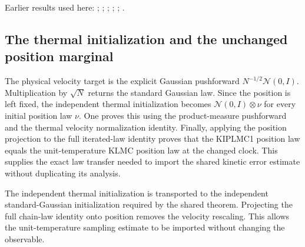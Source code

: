 \documentclass[11pt,a4paper]{report}
\begin{document}
Earlier results used here: \cite[Section~3.33.11]{LangevinLean2026ULASC}; \cite[Section~3.33.6]{LangevinLean2026ULASC}; \cite[Section~3.1.1]{LangevinLean2026IPLA}; \cite[Section~3.1.4]{LangevinLean2026IPLA}; \cite[Section~3.113.3]{LangevinLean2026Kinetic}; \cite[Section~3.12.2]{LangevinLean2026Kinetic}.
\subsection{\texorpdfstring{The thermal initialization and the unchanged position marginal}{The thermal initialization and the unchanged position marginal}}
\label{report-step-KIPLMC-ExponentialRescaling-lean-6}


The physical velocity target is the explicit Gaussian pushforward \(N^{-1/2}\mathcal N(0,I)\). Multiplication by \(\sqrt N\) returns the standard Gaussian law. Since the position is left fixed, the independent thermal initialization becomes \(\mathcal N(0,I)\otimes\nu\) for every initial position law \(\nu\). One proves this using the product-measure pushforward and the thermal velocity normalization identity. Finally, applying the position projection to the full iterated-law identity proves that the KIPLMC1 position law equals the unit-temperature KLMC position law at the changed clock. This supplies the exact law transfer needed to import the shared kinetic error estimate without duplicating its analysis.



The independent thermal initialization is transported to the independent standard-Gaussian initialization required by the shared theorem. Projecting the full chain-law identity onto position removes the velocity rescaling. This allows the unit-temperature sampling estimate to be imported without changing the observable.
\end{document}
